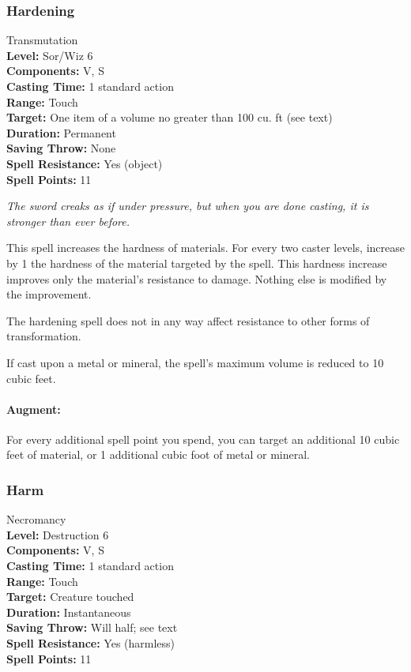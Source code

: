\subsubsection{Hardening}
\label{Spell:Hardening}
Transmutation
\\ \textbf{Level:} Sor/Wiz 6
\\ \textbf{Components:} V, S
\\ \textbf{Casting Time:} 1 standard action
\\ \textbf{Range:} Touch
\\ \textbf{Target:} One item of a volume no greater than 100 cu. ft (see text)
\\ \textbf{Duration:} Permanent
\\ \textbf{Saving Throw:} None
\\ \textbf{Spell Resistance:} Yes (object)
\\ \textbf{Spell Points:} 11

\emph{The sword creaks as if under pressure, but when you are done casting, it is stronger than ever before.}

This spell increases the hardness of materials. For every two caster levels, 
increase by 1 the hardness of the material targeted by the spell. 
This hardness increase improves only the material's resistance to damage. 
Nothing else is modified by the improvement.

The hardening spell does not in any way affect resistance to other forms of transformation.

If cast upon a metal or mineral, the spell's maximum volume is reduced to 10 cubic feet. 

\paragraph{Augment:} For every additional spell point you spend, 
you can target an additional 10 cubic feet of material, 
or 1 additional cubic foot of metal or mineral.
\subsubsection{Harm}
\label{Spell:Harm}
Necromancy
\\ \textbf{Level:} Destruction 6
\\ \textbf{Components:} V, S
\\ \textbf{Casting Time:} 1 standard action
\\ \textbf{Range:} Touch
\\ \textbf{Target:} Creature touched
\\ \textbf{Duration:} Instantaneous
\\ \textbf{Saving Throw:} Will half; see text
\\ \textbf{Spell Resistance:} Yes (harmless)
\\ \textbf{Spell Points:} 11

